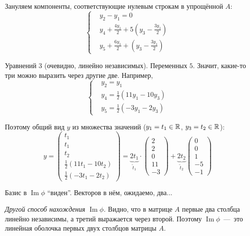 \documentclass[a4paper,12pt]{article}
\DeclareMathOperator{\Imag}{Im}
\begin{document}
\begin{solution}
    Зануляем компоненты, соответствующие нулевым строкам в упрощённой $A$:
    \[
      \left\{
        \begin{aligned}
          &y_2 - y_1 = 0\\
          &y_4 + \frac{4y_1}{2} + 5 \left(y_3 - \frac{3y_1}{2}\right)\\
          &y_5 + \frac{6y_1}{2} + \left(y_3 - \frac{3y_1}{2}\right)
        \end{aligned}
      \right.
    \]
    
    Уравнений $3$ (очевидно, линейно независимых).
    Переменных $5$.
    Значит, какие-то три можно выразить через другие две.
    Например,
    \[
      \left\{
        \begin{aligned}
          &y_2 = y_1\\
          &y_4 = \frac{1}{2} (11y_1 - 10y_3)\\
          &y_5 = \frac{1}{2} (-3y_1 - 2y_3)
        \end{aligned}
      \right.
    \]
    
    Поэтому общий вид $y$ из множества значений ($y_1 \hm= t_1 \hm\in \RR$, $y_3 \hm= t_2 \hm\in \RR$):
    \[
      y = \begin{pmatrix}
        t_1 \\ t_1 \\ t_2 \\ \frac{1}{2} (11 t_1 - 10 t_2) \\ \frac{1}{2} (-3 t_1 - 2 t_2)
      \end{pmatrix}
      = \underbrace{2t_1}_{\tilde{t}_1} \cdot \begin{pmatrix}
        2 \\ 2 \\ 0 \\ 11 \\ -3
      \end{pmatrix} + \underbrace{2t_2}_{\tilde{t}_2} \begin{pmatrix}
        0 \\ 0 \\ 1 \\ -5 \\ -1
      \end{pmatrix}
    \]
    
    Базис в $\Imag\phi$ ``виден''.
    Векторов в нём, ожидаемо, два...
    
    \medskip
    
    \emph{Другой способ нахождения $\Imag \phi$.}
    Видно, что в матрице $A$ первые два столбца линейно независимы, а третий выражается через второй.
    Поэтому $\Imag \phi$~---~это линейная оболочка первых двух столбцов матрицы $A$.
  \end{solution}
  
\end{document}
